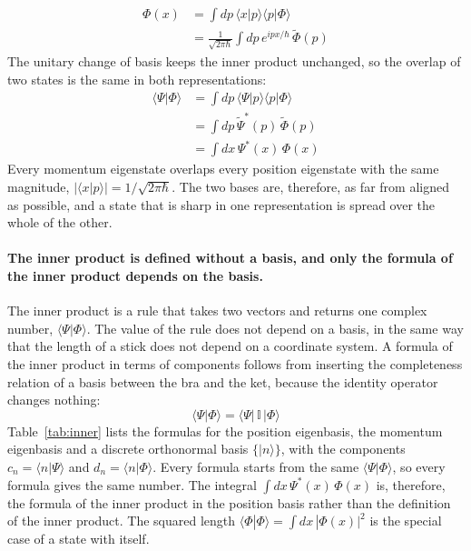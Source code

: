 \documentclass[11pt]{article}      %
\numberwithin{equation}{section}   %
\begin{document}
\begin{align*}
    \Phi(x) &= \int dp\, \langle x | p \rangle \langle p | \Phi \rangle \\
    &= \frac{1}{\sqrt{2\pi\hbar}} \int dp\, e^{ipx/\hbar}\, \tilde{\Phi}(p)
\end{align*}
The unitary change of basis keeps the inner product unchanged, so the overlap of two states is the same in both representations:
\begin{align*}
    \langle \Psi | \Phi \rangle &= \int dp\, \langle \Psi | p \rangle \langle p | \Phi \rangle \\
    &= \int dp\, \tilde{\Psi}^{*}(p)\, \tilde{\Phi}(p) \\
    &= \int dx\, \Psi^{*}(x)\, \Phi(x)
\end{align*}
Every momentum eigenstate overlaps every position eigenstate with the same magnitude, $|\langle x | p \rangle| = 1/\sqrt{2\pi\hbar}$. The two bases are, therefore, as far from aligned as possible, and a state that is sharp in one representation is spread over the whole of the other.

\paragraph{The inner product is defined without a basis, and only the formula of the inner product depends on the basis.} The inner product is a rule that takes two vectors and returns one complex number, $\langle \Psi | \Phi \rangle$. The value of the rule does not depend on a basis, in the same way that the length of a stick does not depend on a coordinate system. A formula of the inner product in terms of components follows from inserting the completeness relation of a basis between the bra and the ket, because the identity operator changes nothing:
\begin{equation*}
    \langle \Psi | \Phi \rangle = \langle \Psi |\, \mathbb{I}\, | \Phi \rangle
\end{equation*}
Table~\ref{tab:inner} lists the formulas for the position eigenbasis, the momentum eigenbasis and a discrete orthonormal basis $\{|n\rangle\}$, with the components $c_n = \langle n | \Psi \rangle$ and $d_n = \langle n | \Phi \rangle$. Every formula starts from the same $\langle \Psi | \Phi \rangle$, so every formula gives the same number. The integral $\int dx\, \Psi^{*}(x)\, \Phi(x)$ is, therefore, the formula of the inner product in the position basis rather than the definition of the inner product. The squared length $\langle \Phi | \Phi \rangle = \int dx\, |\Phi(x)|^2$ is the special case of a state with itself.
\end{document}
